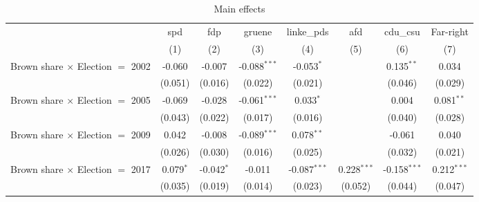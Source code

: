\begin{table}[htbp]
   \caption{Main effects}
   \centering
   \begin{tabular}{lccccccc}
      \tabularnewline \midrule \midrule
                                                              & spd                  & fdp                   & gruene                & linke\_pds     & afd            & cdu\_csu       & Far-right\\  
                                                              & (1)                  & (2)                   & (3)                   & (4)            & (5)            & (6)            & (7)\\  
      Brown share $\times$ Election $=$ 2002                  & -0.060               & -0.007                & -0.088$^{***}$        & -0.053$^{*}$   &                & 0.135$^{**}$   & 0.034\\   
                                                              & (0.051)              & (0.016)               & (0.022)               & (0.021)        &                & (0.046)        & (0.029)\\   
      Brown share $\times$ Election $=$ 2005                  & -0.069               & -0.028                & -0.061$^{***}$        & 0.033$^{*}$    &                & 0.004          & 0.081$^{**}$\\   
                                                              & (0.043)              & (0.022)               & (0.017)               & (0.016)        &                & (0.040)        & (0.028)\\   
      Brown share $\times$ Election $=$ 2009                  & 0.042                & -0.008                & -0.089$^{***}$        & 0.078$^{**}$   &                & -0.061         & 0.040\\   
                                                              & (0.026)              & (0.030)               & (0.016)               & (0.025)        &                & (0.032)        & (0.021)\\   
      Brown share $\times$ Election $=$ 2017                  & 0.079$^{*}$          & -0.042$^{*}$          & -0.011                & -0.087$^{***}$ & 0.228$^{***}$  & -0.158$^{***}$ & 0.212$^{***}$\\   
                                                              & (0.035)              & (0.019)               & (0.014)               & (0.023)        & (0.052)        & (0.044)        & (0.047)\\   

\end{tabular}
\end{table}
